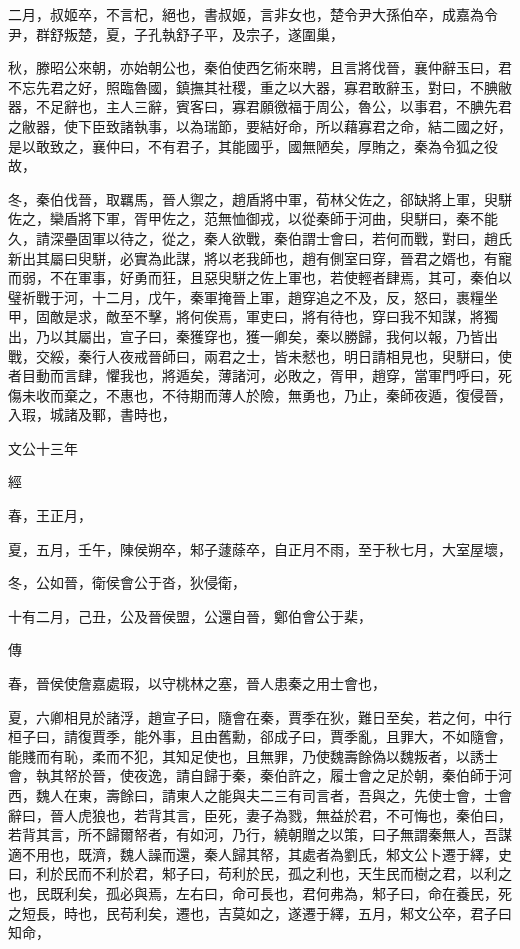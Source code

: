 \documentclass{ctexart}
\begin{document}
二月，叔姬卒，不言杞，絕也，書叔姬，言非女也，楚令尹大孫伯卒，成嘉為令尹，群舒叛楚，夏，子孔執舒子平，及宗子，遂圍巢，

秋，滕昭公來朝，亦始朝公也，秦伯使西乞術來聘，且言將伐晉，襄仲辭玉曰，君不忘先君之好，照臨魯國，鎮撫其社稷，重之以大器，寡君敢辭玉，對曰，不腆敝器，不足辭也，主人三辭，賓客曰，寡君願徼福于周公，魯公，以事君，不腆先君之敝器，使下臣致諸執事，以為瑞節，要結好命，所以藉寡君之命，結二國之好，是以敢致之，襄仲曰，不有君子，其能國乎，國無陋矣，厚賄之，秦為令狐之役故，

冬，秦伯伐晉，取羈馬，晉人禦之，趙盾將中軍，荀林父佐之，郤缺將上軍，臾駢佐之，欒盾將下軍，胥甲佐之，范無恤御戎，以從秦師于河曲，臾駢曰，秦不能久，請深壘固軍以待之，從之，秦人欲戰，秦伯謂士會曰，若何而戰，對曰，趙氏新出其屬曰臾駢，必實為此謀，將以老我師也，趙有側室曰穿，晉君之婿也，有寵而弱，不在軍事，好勇而狂，且惡臾駢之佐上軍也，若使輕者肆焉，其可，秦伯以璧祈戰于河，十二月，戊午，秦軍掩晉上軍，趙穿追之不及，反，怒曰，裹糧坐甲，固敵是求，敵至不擊，將何俟焉，軍吏曰，將有待也，穿曰我不知謀，將獨出，乃以其屬出，宣子曰，秦獲穿也，獲一卿矣，秦以勝歸，我何以報，乃皆出戰，交綏，秦行人夜戒晉師曰，兩君之士，皆未憖也，明日請相見也，臾駢曰，使者目動而言肆，懼我也，將遁矣，薄諸河，必敗之，胥甲，趙穿，當軍門呼曰，死傷未收而棄之，不惠也，不待期而薄人於險，無勇也，乃止，秦師夜遁，復侵晉，入瑕，城諸及鄆，書時也，





文公十三年


經



春，王正月，

夏，五月，壬午，陳侯朔卒，邾子蘧蒢卒，自正月不雨，至于秋七月，大室屋壞，

冬，公如晉，衛侯會公于沓，狄侵衛，

十有二月，己丑，公及晉侯盟，公還自晉，鄭伯會公于棐，

傳



春，晉侯使詹嘉處瑕，以守桃林之塞，晉人患秦之用士會也，

夏，六卿相見於諸浮，趙宣子曰，隨會在秦，賈季在狄，難日至矣，若之何，中行桓子曰，請復賈季，能外事，且由舊勳，郤成子曰，賈季亂，且罪大，不如隨會，能賤而有恥，柔而不犯，其知足使也，且無罪，乃使魏壽餘偽以魏叛者，以誘士會，執其帑於晉，使夜逸，請自歸于秦，秦伯許之，履士會之足於朝，秦伯師于河西，魏人在東，壽餘曰，請東人之能與夫二三有司言者，吾與之，先使士會，士會辭曰，晉人虎狼也，若背其言，臣死，妻子為戮，無益於君，不可悔也，秦伯曰，若背其言，所不歸爾帑者，有如河，乃行，繞朝贈之以策，曰子無謂秦無人，吾謀適不用也，既濟，魏人譟而還，秦人歸其帑，其處者為劉氏，邾文公卜遷于繹，史曰，利於民而不利於君，邾子曰，苟利於民，孤之利也，天生民而樹之君，以利之也，民既利矣，孤必與焉，左右曰，命可長也，君何弗為，邾子曰，命在養民，死之短長，時也，民苟利矣，遷也，吉莫如之，遂遷于繹，五月，邾文公卒，君子曰知命，
\end{document}
